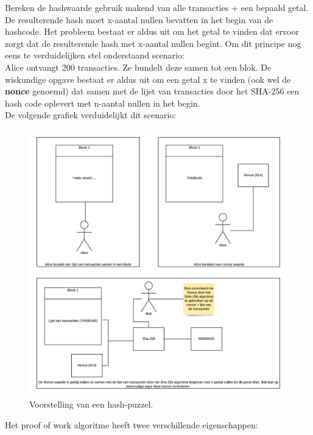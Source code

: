 Bereken de hashwaarde gebruik makend van alle transacties + een bepaald getal. De resulterende hash moet x-aantal nullen bevatten in het begin van de hashcode. Het probleem bestaat er aldus uit om het getal te vinden dat ervoor zorgt dat de resulterende hash met x-aantal nullen begint.  Om dit principe nog eens te verduidelijken stel onderstaand scenario:\\

Alice ontvangt 200 transacties. Ze bundelt deze samen tot een blok. De wiskundige opgave bestaat er aldus uit om een getal x te vinden (ook wel de \textbf{nonce} genoemd) dat samen met de lijst van transacties door het SHA-256 een hash code oplevert met n-aantal nullen in het begin.\\

De volgende grafiek verduidelijkt dit scenario:

\begin{figure}[h!]
	\centering
		\includegraphics[scale=0.3]{blockchain-3.png}
	\caption[Blockchain - Voorstelling 3]{Voorstelling van een hash-puzzel.}
\end{figure}

\newpage

Het proof of work algoritme heeft twee verschillende eigenschappen:

